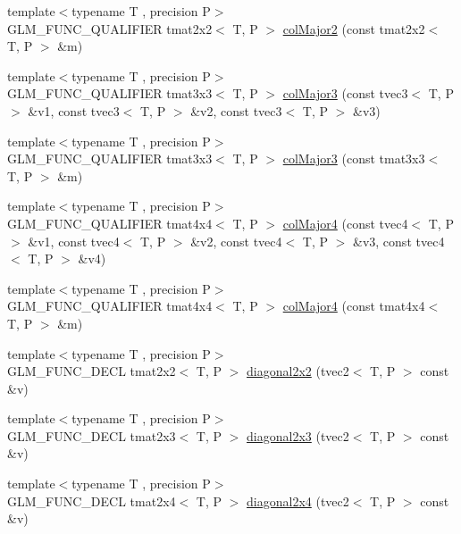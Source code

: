 \begin{DoxyCompactItemize}
\item 
{\footnotesize template$<$typename T , precision P$>$ }\\G\+L\+M\+\_\+\+F\+U\+N\+C\+\_\+\+Q\+U\+A\+L\+I\+F\+I\+E\+R tmat2x2$<$ T, P $>$ \hyperlink{namespaceglm_a57caddbd2a54b700b8c003c2a4db10fc}{col\+Major2} (const tmat2x2$<$ T, P $>$ \&m)
\item 
{\footnotesize template$<$typename T , precision P$>$ }\\G\+L\+M\+\_\+\+F\+U\+N\+C\+\_\+\+Q\+U\+A\+L\+I\+F\+I\+E\+R tmat3x3$<$ T, P $>$ \hyperlink{namespaceglm_aadce1b4310b67a3b296ff5a23be451c0}{col\+Major3} (const tvec3$<$ T, P $>$ \&v1, const tvec3$<$ T, P $>$ \&v2, const tvec3$<$ T, P $>$ \&v3)
\item 
{\footnotesize template$<$typename T , precision P$>$ }\\G\+L\+M\+\_\+\+F\+U\+N\+C\+\_\+\+Q\+U\+A\+L\+I\+F\+I\+E\+R tmat3x3$<$ T, P $>$ \hyperlink{namespaceglm_a46aacefac38ffd9392731232b7022621}{col\+Major3} (const tmat3x3$<$ T, P $>$ \&m)
\item 
{\footnotesize template$<$typename T , precision P$>$ }\\G\+L\+M\+\_\+\+F\+U\+N\+C\+\_\+\+Q\+U\+A\+L\+I\+F\+I\+E\+R tmat4x4$<$ T, P $>$ \hyperlink{namespaceglm_ab71ba69f69c2b3b3b3565fcf150ba315}{col\+Major4} (const tvec4$<$ T, P $>$ \&v1, const tvec4$<$ T, P $>$ \&v2, const tvec4$<$ T, P $>$ \&v3, const tvec4$<$ T, P $>$ \&v4)
\item 
{\footnotesize template$<$typename T , precision P$>$ }\\G\+L\+M\+\_\+\+F\+U\+N\+C\+\_\+\+Q\+U\+A\+L\+I\+F\+I\+E\+R tmat4x4$<$ T, P $>$ \hyperlink{namespaceglm_ac787a46bf97e124bda6317ef12bcda89}{col\+Major4} (const tmat4x4$<$ T, P $>$ \&m)
\item 
{\footnotesize template$<$typename T , precision P$>$ }\\G\+L\+M\+\_\+\+F\+U\+N\+C\+\_\+\+D\+E\+C\+L tmat2x2$<$ T, P $>$ \hyperlink{group__gtx__matrix__operation_ga01dc503262dba9c457113d131fc8c024}{diagonal2x2} (tvec2$<$ T, P $>$ const \&v)
\item 
{\footnotesize template$<$typename T , precision P$>$ }\\G\+L\+M\+\_\+\+F\+U\+N\+C\+\_\+\+D\+E\+C\+L tmat2x3$<$ T, P $>$ \hyperlink{group__gtx__matrix__operation_ga763817f07d6a94b722a48adfa87a35db}{diagonal2x3} (tvec2$<$ T, P $>$ const \&v)
\item 
{\footnotesize template$<$typename T , precision P$>$ }\\G\+L\+M\+\_\+\+F\+U\+N\+C\+\_\+\+D\+E\+C\+L tmat2x4$<$ T, P $>$ \hyperlink{group__gtx__matrix__operation_ga49b37c819cf6dd8e35112ed1a13d45a3}{diagonal2x4} (tvec2$<$ T, P $>$ const \&v)

\end{DoxyCompactItemize}
